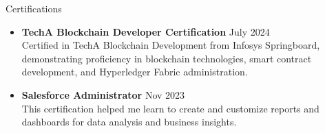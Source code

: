 \documentclass{resume} %
\begin{document}
\begin{rSection}{Certifications} 
        \begin{itemize}


            \item \textbf{TechA Blockchain Developer Certification} \hfill July 2024\\
            Certified in TechA Blockchain Development from Infosys Springboard, demonstrating proficiency in blockchain technologies, smart contract development, and Hyperledger Fabric administration.    
           


            \item \textbf{Salesforce Administrator} \hfill Nov 2023\\
            This certification helped me learn to create and customize reports and dashboards for data analysis and business insights.
   

        \end{itemize}
        
        
        \end{rSection}
         
\end{document}

